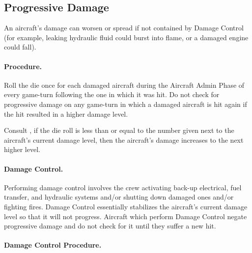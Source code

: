 
\begin{advancedrules}

\section{Progressive Damage}
\label{rule:progressive-damage}


An aircraft's damage can worsen or spread if not contained by Damage Control (for example, leaking hydraulic fluid could burst into flame, or a damaged engine could fall).

\paragraph{Procedure.} Roll the die once for each damaged aircraft during the Aircraft Admin Phase of every game-turn following the one in which it was hit. Do not check for progressive damage on any game-turn in which a damaged aircraft is hit again if the hit resulted in a higher damage level.

Consult , if the die roll is less than or equal to the number given next to the aircraft's current damage level, then the aircraft's damage increases to the next higher level.

\paragraph{Damage Control.} Performing damage control involves the crew activating back-up electrical, fuel transfer, and hydraulic systems and/or shutting down damaged ones and/or fighting fires. Damage Control essentially stabilizes the aircraft's current damage level so that it will not progress. Aircraft which perform Damage Control negate progressive damage and do not check for it until they suffer a new hit.

\paragraph{Damage Control Procedure.} 


\end{advancedrules}
